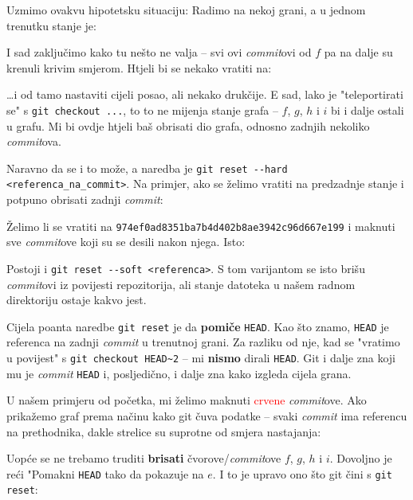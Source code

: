 Uzmimo ovakvu hipotetsku situaciju: Radimo na nekoj grani, a u jednom trenutku stanje je:



I sad zaključimo kako tu nešto ne valja -- svi ovi \emph{commit}ovi od $f$ pa na dalje su krenuli krivim smjerom.
Htjeli bi se nekako vratiti na:



\dots{}i od tamo nastaviti cijeli posao, ali nekako drukčije.
E sad, lako je "teleportirati se" s \verb+git checkout ...+, to to ne mijenja stanje grafa -- $f$, $g$, $h$ i $i$ bi i dalje ostali u grafu.
Mi bi ovdje htjeli baš obrisati dio grafa, odnosno zadnjih nekoliko \emph{commit}ova.

Naravno da se i to može, a naredba je \verb+git reset --hard <referenca_na_commit>+.
Na primjer, ako se želimo vratiti na predzadnje stanje i potpuno obrisati zadnji \emph{commit}:


Želimo li se vratiti na \verb+974ef0ad8351ba7b4d402b8ae3942c96d667e199+ i maknuti sve \emph{commit}ove koji su se desili nakon njega.
Isto:


Postoji i \verb+git reset --soft <referenca>+. 
S tom varijantom se isto brišu \emph{commit}ovi iz povijesti repozitorija, ali stanje datoteka u našem radnom direktoriju ostaje kakvo jest.

Cijela poanta naredbe \verb+git reset+ je da \textbf{pomiče} \verb+HEAD+.
Kao što znamo, \verb+HEAD+ je referenca na zadnji \emph{commit} u trenutnoj grani.
Za razliku od nje, kad se "vratimo u povijest" s \verb+git checkout HEAD~2+ -- mi \textbf{nismo} dirali \verb+HEAD+.
Git i dalje zna koji mu je \emph{commit} \verb+HEAD+ i, posljedično, i dalje zna kako izgleda cijela grana.

U našem primjeru od početka, mi želimo maknuti \textcolor{red}{crvene} \emph{commit}ove. 
Ako prikažemo graf prema načinu kako git čuva podatke -- svaki \emph{commit} ima referencu na prethodnika, dakle strelice su suprotne od smjera nastajanja:



Uopće se ne trebamo truditi \textbf{brisati} čvorove/\emph{commit}ove $f$, $g$, $h$ i $i$.
Dovoljno je reći "Pomakni \verb+HEAD+ tako da pokazuje na $e$.
I to je upravo ono što git čini s \verb+git reset+:

